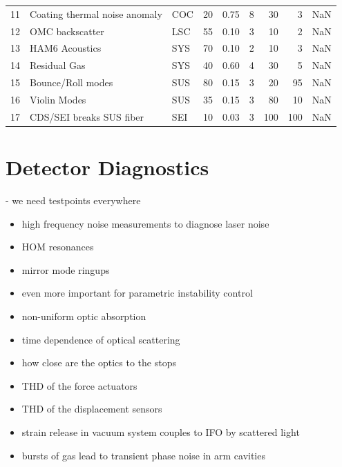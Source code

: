 \begin{table}
\begin{tabular}{lllrrrrrr}
11 &        Coating thermal noise anomaly &        COC &               20 &              0.75 &                8 &                    30 &                     3 &             NaN \\
12 &                      OMC backscatter &        LSC &               55 &              0.10 &                3 &                    10 &                     2 &             NaN \\
13 &                       HAM6 Acoustics &        SYS &               70 &              0.10 &                2 &                    10 &                     3 &             NaN \\
14 &                         Residual Gas &        SYS &               40 &              0.60 &                4 &                    30 &                     5 &             NaN \\
15 &                    Bounce/Roll modes &        SUS &               80 &              0.15 &                3 &                    20 &                    95 &             NaN \\
16 &                         Violin Modes &        SUS &               35 &              0.15 &                3 &                    80 &                    10 &             NaN \\
17 &             CDS/SEI breaks SUS fiber &        SEI &               10 &              0.03 &                3 &                   100 &                   100 &             NaN \\
\end{tabular}
\end{table}

\section{Detector Diagnostics}
   - we need testpoints everywhere

\begin{itemize}
  \item high frequency noise measurements to diagnose laser noise
  \item HOM resonances
  \item mirror mode ringups
  \item even more important for parametric instability control\cite{Matt:PI}
  \item non-uniform optic absorption
  \item time dependence of optical scattering
  \item how close are the optics to the stops
  \item THD of the force actuators
  \item THD of the displacement sensors
  \item strain release in vacuum system couples to IFO by scattered light
  \item bursts of gas lead to transient phase noise in arm cavities
\end{itemize}

